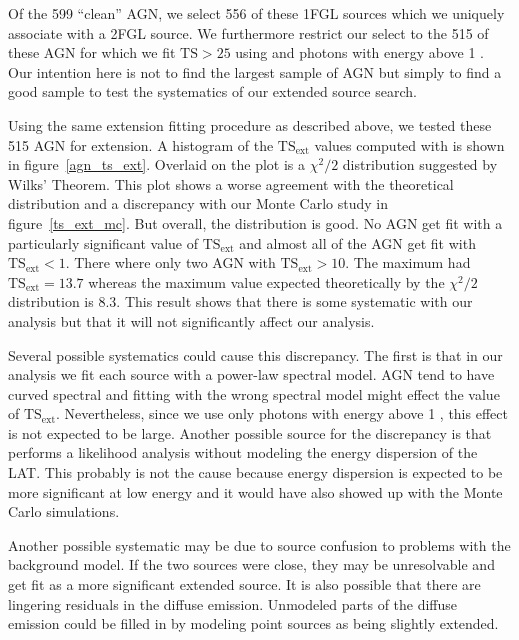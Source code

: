 \documentclass[12pt,preprint]{aastex}
\newcommand{\gev}{\text{GeV}\xspace}
\newcommand{\tsext}{{\ensuremath{\text{TS}_\text{ext}}}\xspace}
\newcommand{\ts}{\text{TS}\xspace}
\newcommand{\pointlike}{\text{\em pointlike}\xspace}
\begin{document}
Of the 599 ``clean'' AGN, we select 556 of these 1FGL sources which
we uniquely associate with a 2FGL source. We furthermore
restrict our select to the 515 of these AGN for which we fit $\ts>25$
using \pointlike and photons with energy above 1 \gev.  Our intention
here is not to find the largest sample of AGN but simply
to find a good sample to test the systematics of our extended source
search.

Using the same extension fitting procedure as described above, we tested
these 515 AGN for extension. A histogram of the \tsext values computed
with \pointlike is shown in figure~\ref{agn_ts_ext}. Overlaid on the plot
is a $\chi^2/2$ distribution suggested by Wilks' Theorem.  This plot
shows a worse agreement with the theoretical distribution and
a discrepancy with 
our Monte Carlo study in figure~\ref{ts_ext_mc}.  But overall, the
distribution is good. No AGN get fit with a particularly significant
value of $\tsext$ and almost all of the AGN get fit with $\tsext<1$.
There where only two AGN with $\tsext>10$. The maximum had $\tsext=13.7$
whereas the maximum value expected theoretically by the $\chi^2/2$ distribution is
8.3. This result shows that there is some systematic with our
analysis but that it will not significantly affect our analysis.

Several possible systematics could cause this discrepancy. The first is
that in our analysis we fit each source with a power-law spectral model.
AGN tend to have curved spectral and fitting with the wrong spectral
model might effect the value of \tsext. Nevertheless, since we use only
photons with energy above 1 \gev, this effect is not expected to be large.
Another possible source for the discrepancy is that \pointlike performs
a likelihood analysis without modeling the energy dispersion of the LAT.
This probably is not the cause because energy dispersion is expected to
be more significant at low energy and it would have also showed up with
the Monte Carlo simulations.

Another possible systematic may be due to source confusion to problems
with the background model. If the two sources were close, they may
be unresolvable and get fit as a more significant extended source.
It is also possible that there are lingering residuals in the diffuse
emission. Unmodeled parts of the diffuse emission could be filled in by
modeling point sources as being slightly extended.
\end{document}
